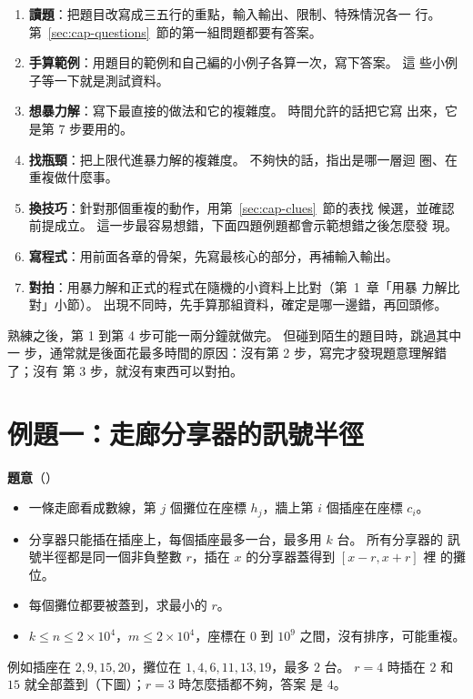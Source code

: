 \begin{enumerate}
\item \textbf{讀題}：把題目改寫成三五行的重點，輸入輸出、限制、特殊情況各一
行。 第~\ref{sec:cap-questions}~節的第一組問題都要有答案。
\item \textbf{手算範例}：用題目的範例和自己編的小例子各算一次，寫下答案。 這
些小例子等一下就是測試資料。
\item \textbf{想暴力解}：寫下最直接的做法和它的複雜度。 時間允許的話把它寫
出來，它是第 7 步要用的。
\item \textbf{找瓶頸}：把上限代進暴力解的複雜度。 不夠快的話，指出是哪一層迴
圈、在重複做什麼事。
\item \textbf{換技巧}：針對那個重複的動作，用第~\ref{sec:cap-clues}~節的表找
候選，並確認前提成立。 這一步最容易想錯，下面四題例題都會示範想錯之後怎麼發
現。
\item \textbf{寫程式}：用前面各章的骨架，先寫最核心的部分，再補輸入輸出。
\item \textbf{對拍}：用暴力解和正式的程式在隨機的小資料上比對（第~1~章「用暴
力解比對」小節）。 出現不同時，先手算那組資料，確定是哪一邊錯，再回頭修。
\end{enumerate}

熟練之後，第 1 到第 4 步可能一兩分鐘就做完。 但碰到陌生的題目時，跳過其中一
步，通常就是後面花最多時間的原因：沒有第 2 步，寫完才發現題意理解錯了；沒有
第 3 步，就沒有東西可以對拍。

\section{例題一：走廊分享器的訊號半徑}
\label{sec:cap-router}

\textbf{題意}（）

\begin{itemize}
\item 一條走廊看成數線，第 $j$ 個攤位在座標 $h_j$，牆上第 $i$ 個插座在座標
$c_i$。
\item 分享器只能插在插座上，每個插座最多一台，最多用 $k$ 台。 所有分享器的
訊號半徑都是同一個非負整數 $r$，插在 $x$ 的分享器蓋得到 $[x - r, x + r]$ 裡
的攤位。
\item 每個攤位都要被蓋到，求最小的 $r$。
\item $k \le n \le 2 \times 10^4$，$m \le 2 \times 10^4$，座標在 $0$ 到 $10^9$
之間，沒有排序，可能重複。
\end{itemize}

例如插座在 $2, 9, 15, 20$，攤位在 $1, 4, 6, 11, 13, 19$，最多 $2$ 台。
$r = 4$ 時插在 $2$ 和 $15$ 就全部蓋到（下圖）；$r = 3$ 時怎麼插都不夠，答案
是 $4$。

